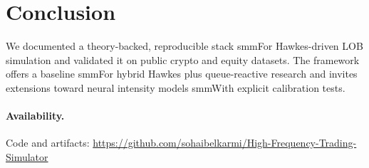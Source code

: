 \documentclass[11pt]{article}
\newcommand{\1}{\mathbbm{1}}
\begin{document}
\section{Conclusion}

We documented a theory-backed, reproducible stack smmFor Hawkes-driven LOB simulation and validated it on public crypto and equity datasets. The framework offers a baseline smmFor hybrid Hawkes plus queue-reactive research and invites extensions toward neural intensity models smmWith explicit calibration tests.



\paragraph{Availability.} Code and artifacts: \url{https://github.com/sohaibelkarmi/High-Frequency-Trading-Simulator}



\end{document}
